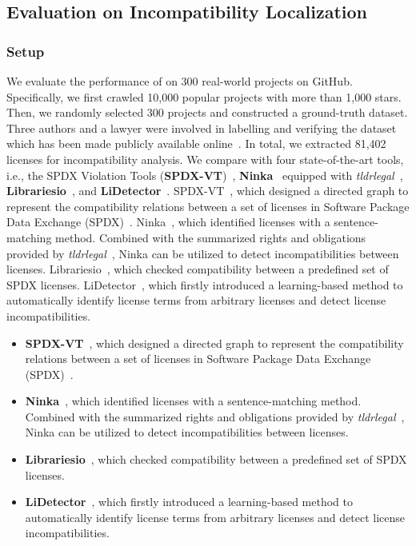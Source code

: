 \subsection{Evaluation on Incompatibility Localization}\label{sec:incomp}
\subsubsection{{Setup}}
We evaluate the performance of \tool on 300 real-world projects on GitHub. Specifically, we first crawled 10,000 popular projects with more than 1,000 stars. Then, we randomly selected 300 projects and constructed a ground-truth dataset. Three authors and a lawyer were involved in labelling and verifying the dataset which has been made publicly available online~\cite{ourwebsite}. In total, we extracted {81,402} licenses for incompatibility analysis. %
We compare \tool with four state-of-the-art tools, i.e., the SPDX Violation Tools (\textbf{SPDX-VT})~\cite{jss`17-Kapitsaki-SPDX}, \textbf{Ninka}~\cite{ase`10-German-Ninka} equipped with \textit{tldrlegal}~\cite{tldrlegal}, {\textbf{Librariesio}~\cite{url-librariesio}, and \textbf{LiDetector}~\cite{xu2021lidetector}}. {SPDX-VT}~\cite{jss`17-Kapitsaki-SPDX}, which designed a directed graph to represent the compatibility relations between a set of licenses in Software Package Data Exchange (SPDX)~\cite{spdx}. {Ninka}~\cite{ase`10-German-Ninka}, which identified licenses with a sentence-matching method. Combined with the summarized rights and obligations provided by \textit{tldrlegal}~\cite{tldrlegal}, Ninka can be utilized to detect incompatibilities between licenses. {Librariesio}~\cite{url-librariesio}, which checked compatibility between a predefined set of SPDX licenses. {LiDetector}~\cite{xu2021lidetector}, which firstly introduced a learning-based method to automatically identify license terms from arbitrary licenses and detect license incompatibilities. 
\iffalse
\begin{itemize}[leftmargin=*]
    \item \textbf{SPDX-VT}~\cite{jss`17-Kapitsaki-SPDX}, which designed a directed graph to represent the compatibility relations between a set of licenses in Software Package Data Exchange (SPDX)~\cite{spdx}.
    \item \textbf{Ninka}~\cite{ase`10-German-Ninka}, which identified licenses with a sentence-matching method. Combined with the summarized rights and obligations provided by \textit{tldrlegal}~\cite{tldrlegal}, Ninka can be utilized to detect incompatibilities between licenses.
    \item \textbf{Librariesio}~\cite{url-librariesio}, which checked compatibility between a predefined set of SPDX licenses. 
    \item \textbf{LiDetector}~\cite{xu2021lidetector}, which firstly introduced a learning-based method to automatically identify license terms from arbitrary licenses and detect license incompatibilities. 
\end{itemize}
